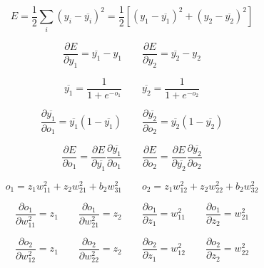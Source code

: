 \begin{equation}
    E = \frac{1}{2} \sum_{i}{(y_i - \overline{y_i})^2} =
    \frac{1}{2} \left[ (y_1 - \overline{y_1})^2 + (y_2 - \overline{y_2})^2 \right]
\end{equation}

\begin{equation*}
    \frac{\partial E}{\partial y_1} = \overline{y_1} - y_1
    \qquad %
    \frac{\partial E}{\partial y_2} = \overline{y_2} - y_2
\end{equation*}

\begin{equation}
    \overline{y_1} = \frac{1}{1+ e^{-o_1}}
    \qquad %
    \overline{y_2} = \frac{1}{1+ e^{-o_2}}
\end{equation}

\begin{equation*}
    \frac{\partial \overline{y_1}}{\partial o_1} = \overline{y_1} (1 - \overline{y_1})
    \qquad %
    \frac{\partial \overline{y_2}}{\partial o_2} = \overline{y_2} (1 - \overline{y_2})
\end{equation*}

\begin{equation*}
    \frac{\partial E}{\partial o_1} =
    \frac{\partial E}{\partial \overline{y_1}} \frac{\partial \overline{y_1}}{\partial o_1}
    \qquad %
    \frac{\partial E}{\partial o_2} =
    \frac{\partial E}{\partial \overline{y_2}} \frac{\partial \overline{y_2}}{\partial o_2}
\end{equation*}

\begin{equation}
    o_1 =  z_1 w_{11}^2 + z_2 w_{21}^2 + b_2 w_{31}^2
    \qquad %
    o_2 =  z_1 w_{12}^2 + z_2 w_{22}^2 + b_2 w_{32}^2
\end{equation}

\begin{equation*}
    \frac{\partial o_1}{\partial w_{11}^2} = z_1
    \qquad %
    \frac{\partial o_1}{\partial w_{21}^2} = z_2
    \qquad %
    \frac{\partial o_1}{\partial z_1} = w_{11}^2
    \qquad %
    \frac{\partial o_1}{\partial z_2} = w_{21}^2
\end{equation*}

\begin{equation*}
    \frac{\partial o_2}{\partial w_{12}^2} = z_1
    \qquad %
    \frac{\partial o_2}{\partial w_{22}^2} = z_2
    \qquad %
    \frac{\partial o_2}{\partial z_1} = w_{12}^2
    \qquad %
    \frac{\partial o_2}{\partial z_2} = w_{22}^2
\end{equation*}

